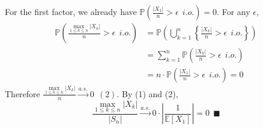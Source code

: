 \documentclass[a4paper,12pt,twoside]{book}
\begin{document}
\begin{itemize}
\begin{equation}
	\end{equation}
	For the first factor, we already have $\mathbb{P}\left(\frac{|X_1|}{n}>\epsilon~~i.o.\right)=0$. For any $\epsilon$,
	\begin{equation}
		\begin{split}
			\mathbb{P}\left(\frac{\max\limits_{1\leq k\leq n}|X_k|}{n}>\epsilon~~i.o.\right)&=\mathbb{P}\left(\bigcup_{k=1}^n\left\{\frac{|X_k|}{n}>\epsilon~~i.o.\right\}\right)\\
			&=\sum_{k=1}^n\mathbb{P}\left(\frac{|X_k|}{n}>\epsilon~~i.o.\right)\\
			&=n\cdot \mathbb{P}\left(\frac{|X_1|}{n}>\epsilon~~i.o.\right)=0
		\end{split}
	\end{equation}
	Therefore $\frac{\max\limits_{1\leq k\leq n}|X_k|}{n} \xrightarrow{a.s.} 0~~(2)$. By (1) and (2),
	\begin{equation}
		\frac{\max\limits_{1\leq k\leq n}|X_k|}{|S_n|} \xrightarrow{a.s.} 0 \cdot \left|\frac{1}{\mathbb{E}\left[X_1\right]}\right|=0~~\blacksquare
	\end{equation}
\end{itemize}
\end{document}
